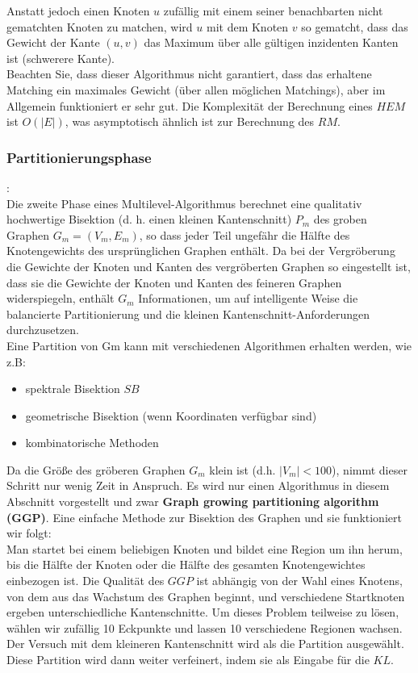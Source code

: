 \documentclass[runningheads]{llncs}
\begin{document}
\begin{itemize}
	 Anstatt jedoch einen Knoten $u$ zufällig mit einem seiner benachbarten nicht gematchten Knoten zu matchen, wird $u$ mit dem Knoten $v$ so gematcht, dass das Gewicht der Kante $(u, v)$ das Maximum über alle gültigen inzidenten Kanten ist (schwerere Kante). \\
	 Beachten Sie, dass dieser Algorithmus nicht garantiert, dass das erhaltene Matching ein maximales Gewicht (über
	 allen möglichen Matchings), aber im Allgemein funktioniert er sehr gut. Die Komplexität der Berechnung eines $HEM$ ist $O(\lvert E \lvert)$, was asymptotisch ähnlich ist zur Berechnung des $RM$.
\end{itemize}


\subsubsection{Partitionierungsphase}:\\[8pt]
Die zweite Phase eines Multilevel-Algorithmus berechnet
eine qualitativ hochwertige Bisektion (d. h. einen kleinen Kantenschnitt) $P_m$ des groben Graphen $G_m = (V_m, E_m)$,
so dass jeder Teil ungefähr die Hälfte des Knotengewichts des ursprünglichen Graphen enthält. Da bei der Vergröberung die Gewichte der Knoten und Kanten des vergröberten Graphen so eingestellt ist, dass sie die Gewichte der Knoten und Kanten des feineren Graphen widerspiegeln, enthält $G_m$ Informationen, um auf intelligente Weise die balancierte Partitionierung und die kleinen Kantenschnitt-Anforderungen durchzusetzen.\\
Eine Partition von Gm kann mit verschiedenen Algorithmen erhalten werden, wie z.B:
\begin{itemize}
	\item spektrale Bisektion $SB$
	\item geometrische Bisektion (wenn Koordinaten verfügbar sind)
	\item kombinatorische Methoden
\end{itemize}
Da die Größe des
gröberen Graphen $G_m$ klein ist (d.h. $\lvert V_m \lvert < 100$), nimmt dieser Schritt nur wenig Zeit in Anspruch.
Es wird nur einen Algorithmus in diesem Abschnitt vorgestellt und zwar \textbf{Graph growing partitioning algorithm (GGP)}. Eine einfache Methode zur Bisektion des Graphen und sie funktioniert wir folgt:\\
Man startet bei einem beliebigen Knoten und bildet eine Region um ihn herum, bis die Hälfte der Knoten oder die Hälfte des gesamten Knotengewichtes einbezogen ist. Die Qualität des $GGP$ ist abhängig von der Wahl eines Knotens, von dem aus das Wachstum des Graphen beginnt, und verschiedene Startknoten ergeben unterschiedliche Kantenschnitte.  
 Um dieses Problem teilweise zu lösen, wählen wir zufällig 10 Eckpunkte
und lassen 10 verschiedene Regionen wachsen. Der Versuch mit dem kleineren Kantenschnitt wird als
die Partition ausgewählt. Diese Partition wird dann weiter verfeinert, indem sie als Eingabe für die $KL$.
\end{document}
